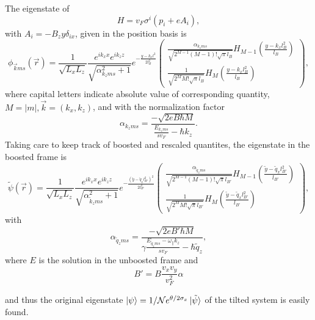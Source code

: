 The eigenstate of
\[
H = v_{F} \sigma ^{i} ( p_{i} + e A_{i} ),
\]
with \(A_{i} = - B_{z} y \delta _{i x}\), given in the position basis is
\begin{equation}
  \phi _{\vec{k} m s}(\vec{r}) = \frac{1}{\sqrt{L_xL_z}}
  \frac{e^{ik_x x}e^{ik_z z}}{\sqrt{\alpha _{k_z m s}^2 + 1}}
  e^{-\frac{y-k_x l^2}{2 l_B^2}}
  \begin{pmatrix}
    \frac{\alpha _{k_z m s}}{\sqrt{2^{M-1} (M-1)! \sqrt{\pi } l_B}} H_{M-1}\left( \frac{y-k_x l_B^2}{l_B} \right)\\
    \frac{1}{\sqrt{2^M M! \sqrt{\pi } l_B}} H_M \left( \frac{y-k_x l_B^2}{l_B} \right)
  \end{pmatrix},
\end{equation}
where capital letters indicate absolute value of corresponding quantity, $M=|m|, \vec{k} = (k_x, k_z)$, and with the normalization factor
\begin{equation}
  \alpha _{k_z m s} = \frac{-\sqrt{2eB\hbar M}}{\frac{E_{k_z m s}}{s v_{F}} - \hbar  k_z}.
\end{equation}
Taking care to keep track of boosted and rescaled quantites, the eigenstate in the boosted frame is
\begin{equation}
  \label{eq:29}
  \tilde{\psi}(\vec{r}) =
  \frac{1}{\sqrt{L_xL_z}}
  \frac{e^{ik_x x}e^{i k_z z}}{\sqrt{\alpha _{\tilde{k}_z m s}^2 + 1}}
  e^{-\frac{\left(\tilde{y} - \tilde{q}_x l_{B'}^2\right)^2}{2 l_{B'}^2}}
  \begin{pmatrix}
    \frac{\alpha _{\tilde{q}_z m s}}{\sqrt{2^{M-1} (M-1)! \sqrt{\pi } l_{B'}}} H_{M-1}\left( \frac{\tilde{y} - \tilde{q}_x l_{B'}^2}{l_{B'}} \right)\\
    \frac{1}{\sqrt{2^M M! \sqrt{\pi } l_{B'}}} H_M \left( \frac{\tilde{y} - \tilde{q}_x l_{B'}^2}{l_{B'}} \right)
  \end{pmatrix},
\end{equation}
with
\begin{equation}
  \alpha _{\tilde{q}_z m s} = \frac{-\sqrt{2e B' \hbar M}}{ \gamma \frac{E_{\tilde{q}_z m s} - \omega _{\parallel} k_{z}}{s v_{F}} - \hbar  \tilde{q}_z},
\end{equation}
where \(E\) is the solution in the unboosted frame and
\[
B' = B \frac{v_{x} v_{y}}{v_{F}^2} \alpha
\]


and thus the original eigenstate \(\ket{\psi } = 1 /\mathcal{N} e^{\theta /2 \sigma _{x}} \ket{\tilde{\psi} }\) of the tilted system is easily found.

